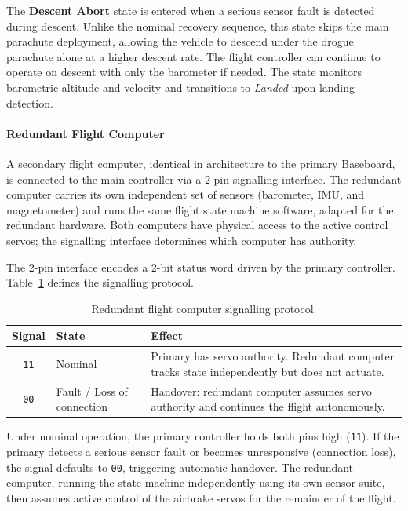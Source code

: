 The \textbf{Descent Abort} state is entered when a serious sensor fault is detected during descent. Unlike the nominal recovery sequence, this state skips the main parachute deployment, allowing the vehicle to descend under the drogue parachute alone at a higher descent rate. The flight controller can continue to operate on descent with only the barometer if needed. The state monitors barometric altitude and velocity and transitions to \emph{Landed} upon landing detection.

\paragraph{Redundant Flight Computer}

A secondary flight computer, identical in architecture to the primary Baseboard, is connected to the main controller via a 2-pin signalling interface. The redundant computer carries its own independent set of sensors (barometer, IMU, and magnetometer) and runs the same flight state machine software, adapted for the redundant hardware. Both computers have physical access to the active control servos; the signalling interface determines which computer has authority.

The 2-pin interface encodes a 2-bit status word driven by the primary controller. Table~\ref{tab:redundancy_signals} defines the signalling protocol.

\begin{table}[H]
\centering
\caption{Redundant flight computer signalling protocol.}
\label{tab:redundancy_signals}
\begin{tabularx}{\textwidth}{c l X}
\toprule
\textbf{Signal} & \textbf{State} & \textbf{Effect} \\
\midrule
\texttt{11} & Nominal & Primary has servo authority. Redundant computer tracks state independently but does not actuate. \\
\addlinespace
\texttt{00} & Fault / Loss of connection & Handover: redundant computer assumes servo authority and continues the flight autonomously. \\
\bottomrule
\end{tabularx}
\end{table}

Under nominal operation, the primary controller holds both pins high (\texttt{11}). If the primary detects a serious sensor fault or becomes unresponsive (connection loss), the signal defaults to \texttt{00}, triggering automatic handover. The redundant computer, running the state machine independently using its own sensor suite, then assumes active control of the airbrake servos for the remainder of the flight.

